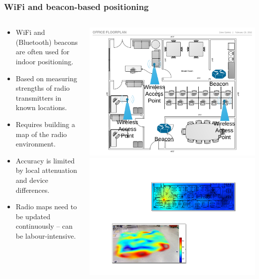 \documentclass[xcolor=svgnames,english,presentation]{beamer}
\begin{document}
\begin{frame}
  \frametitle{WiFi and beacon-based positioning}

  \begin{columns}
  \begin{column}{0.6\textwidth}
  \begin{itemize}[<+->]       
  \item \alert{WiFi and (Bluetooth) beacons} are often used for indoor positioning.
  \item Based on measuring strengths of \alert{radio transmitters in known locations}.
  \item Requires building a \alert{map of the radio environment}.
  \item \alert{Accuracy} is limited by \alert{local attenuation and device differences}.
  \item \alert{Radio maps} need to be \alert{updated} continuously -- can be labour-intensive.
  \end{itemize}
  \end{column}
  \begin{column}{0.4\textwidth}
  \includegraphics[width=\columnwidth]{floorplan} \\
  \vspace{2em}
  \includegraphics[width=\columnwidth]{wifimap}
  \end{column}
  \end{columns}
\end{frame}
\end{document}
